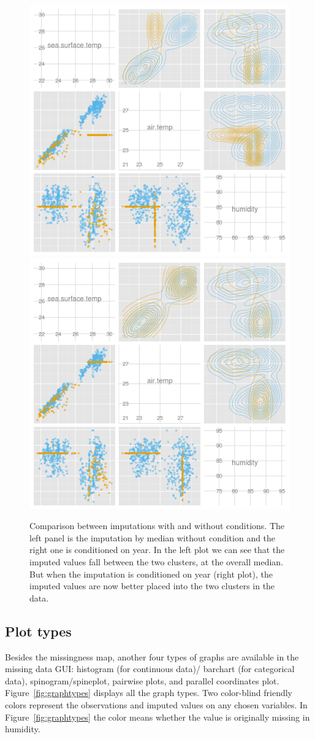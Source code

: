 \documentclass[article]{jss}
\begin{document}
\begin{center}
\begin{figure}[h]
\begin{centering}
\includegraphics[width=.48\textwidth]{graph/fig4-1-median-uncondition}
\includegraphics[width=.48\textwidth]{graph/fig4-2-median-condition}
\par\end{centering}
\caption{Comparison between imputations with and without conditions. The left panel is the imputation by median without condition and the right one is conditioned on year. In the left plot we can see that the imputed values fall between the two clusters, at the overall median. But when the imputation is conditioned on year (right plot), the imputed values are now better placed into the two clusters in the data.}
\label{fig: condition}
\end{figure}
\par\end{center}


\subsection{Plot types}\label{plottype}

Besides the missingness map, another four types of graphs are available in the missing data GUI: histogram (for continuous data)/ barchart (for categorical data), spinogram/spineplot, pairwise plots, and parallel coordinates plot. Figure~\ref{fig:graphtypes} displays all the graph types. Two color-blind friendly colors represent the observations and imputed values on any chosen variables. In Figure~\ref{fig:graphtypes} the color means whether the value is originally missing in humidity.
\end{document}
